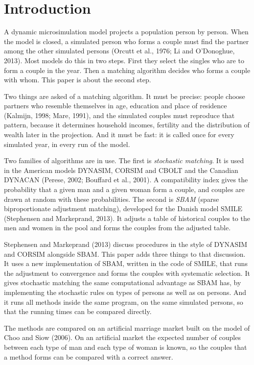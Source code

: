 \documentclass[12pt,a4paper]{article}
\begin{document}
\section{Introduction}

A dynamic microsimulation model projects a population person by person. When the model is closed,
a simulated person who forms a couple must find the partner among the other simulated persons
(Orcutt et al., 1976; Li and O'Donoghue, 2013). Most models do this in two steps. First they
select the singles who are to form a couple in the year. Then a matching algorithm decides who
forms a couple with whom. This paper is about the second step.

Two things are asked of a matching algorithm. It must be precise: people choose partners who
resemble themselves in age, education and place of residence (Kalmijn, 1998; Mare, 1991), and
the simulated couples must reproduce that pattern, because it determines household incomes,
fertility and the distribution of wealth later in the projection. And it must be fast: it is
called once for every simulated year, in every run of the model.

Two families of algorithms are in use. The first is \emph{stochastic matching}. It is used in the
American models DYNASIM, CORSIM and CBOLT and the Canadian DYNACAN (Perese, 2002; Bouffard et
al., 2001). A compatibility index gives the probability that a given man and a given woman form a
couple, and couples are drawn at random with these probabilities. The second is \emph{SBAM}
(sparse biproportionate adjustment matching), developed for the Danish model SMILE (Stephensen
and Markeprand, 2013). It adjusts a table of historical couples to the men and women in the pool
and forms the couples from the adjusted table.

Stephensen and Markeprand (2013) discuss procedures in the style of DYNASIM and CORSIM alongside
SBAM. This paper adds three things to that discussion. It uses a new implementation of SBAM,
written in the code of SMILE, that runs the adjustment to convergence and forms the couples with
systematic selection. It gives stochastic matching the same computational advantage as SBAM has,
by implementing the stochastic rules on types of persons as well as on persons. And it runs all
methods inside the same program, on the same simulated persons, so that the running times can be
compared directly.

The methods are compared on an artificial marriage market built on the model of Choo and Siow
(2006). On an artificial market the expected number of couples between each type of man and each
type of woman is known, so the couples that a method forms can be compared with a correct answer.
\end{document}
